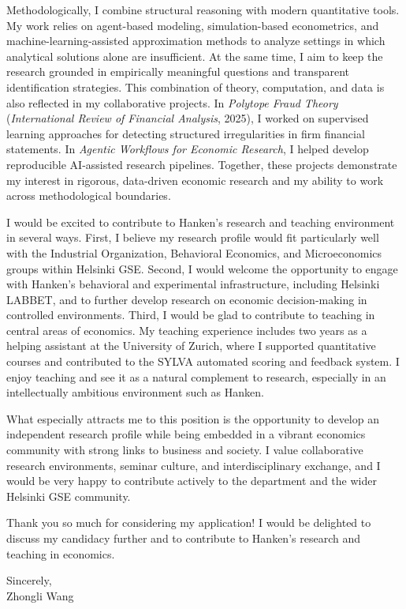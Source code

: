 \documentclass[11pt]{article}
\begin{document}
Methodologically, I combine structural reasoning with modern quantitative tools. My work relies on agent-based modeling, simulation-based econometrics, and machine-learning-assisted approximation methods to analyze settings in which analytical solutions alone are insufficient. At the same time, I aim to keep the research grounded in empirically meaningful questions and transparent identification strategies. This combination of theory, computation, and data is also reflected in my collaborative projects. In \textit{Polytope Fraud Theory} (\textit{International Review of Financial Analysis}, 2025), I worked on supervised learning approaches for detecting structured irregularities in firm financial statements. In \textit{Agentic Workflows for Economic Research}, I helped develop reproducible AI-assisted research pipelines. Together, these projects demonstrate my interest in rigorous, data-driven economic research and my ability to work across methodological boundaries.

I would be excited to contribute to Hanken's research and teaching environment in several ways. First, I believe my research profile would fit particularly well with the Industrial Organization, Behavioral Economics, and Microeconomics groups within Helsinki GSE. Second, I would welcome the opportunity to engage with Hanken's behavioral and experimental infrastructure, including Helsinki LABBET, and to further develop research on economic decision-making in controlled environments. Third, I would be glad to contribute to teaching in central areas of economics. My teaching experience includes two years as a helping assistant at the University of Zurich, where I supported quantitative courses and contributed to the SYLVA automated scoring and feedback system. I enjoy teaching and see it as a natural complement to research, especially in an intellectually ambitious environment such as Hanken.

What especially attracts me to this position is the opportunity to develop an independent research profile while being embedded in a vibrant economics community with strong links to business and society. I value collaborative research environments, seminar culture, and interdisciplinary exchange, and I would be very happy to contribute actively to the department and the wider Helsinki GSE community.

Thank you so much for considering my application! I would be delighted to discuss my candidacy further and to contribute to Hanken's research and teaching in economics.

\vspace{6mm}

\noindent Sincerely,\\[12mm]
\noindent Zhongli Wang
\end{document}

